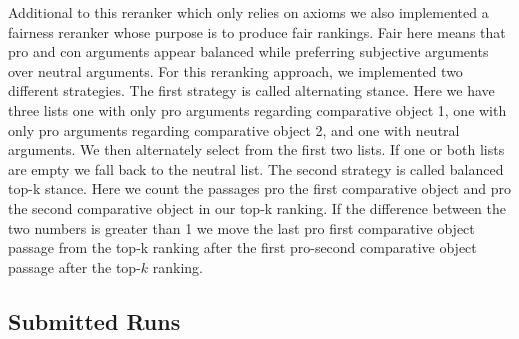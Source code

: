 Additional to this reranker which only relies on axioms we also implemented a fairness reranker whose purpose is to produce fair rankings. Fair here means that pro and con arguments appear balanced while preferring subjective arguments over neutral arguments. For this reranking approach, we implemented two different strategies. The first strategy is called alternating stance. Here we have three lists one with only pro arguments regarding comparative object 1, one with only pro arguments regarding comparative object 2, and one with neutral arguments. We then alternately select from the first two lists. If one or both lists are empty we fall back to the neutral list. The second strategy is called balanced top-k stance. Here we count the passages pro the first comparative object and pro the second comparative object in our top-k ranking. If the difference between the two numbers is greater than 1 we move the last pro first comparative object passage from the top-k ranking after the first pro-second comparative object passage after the top-\(k\) ranking.

\subsection{Submitted Runs}

